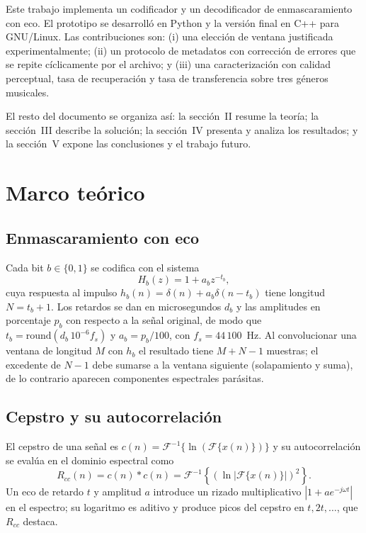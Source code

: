 \documentclass[journal]{IEEEtran}
\begin{document}
Este trabajo implementa un codificador y un decodificador de enmascaramiento con eco. El prototipo se desarrolló en Python y la versión final en C++ para GNU/Linux. Las contribuciones son: (i) una elección de ventana justificada experimentalmente; (ii) un protocolo de metadatos con corrección de errores que se repite cíclicamente por el archivo; y (iii) una caracterización con calidad perceptual, tasa de recuperación y tasa de transferencia sobre tres géneros musicales.

El resto del documento se organiza así: la sección~II resume la teoría; la sección~III describe la solución; la sección~IV presenta y analiza los resultados; y la sección~V expone las conclusiones y el trabajo futuro.

\section{Marco teórico}
\subsection{Enmascaramiento con eco}
Cada bit $b\in\{0,1\}$ se codifica con el sistema
\begin{equation}
H_b(z)=1+a_b z^{-t_b},
\label{eq:hb}
\end{equation}
cuya respuesta al impulso $h_b(n)=\delta(n)+a_b\delta(n-t_b)$ tiene longitud $N=t_b+1$. Los retardos se dan en microsegundos $d_b$ y las amplitudes en porcentaje $p_b$ con respecto a la señal original, de modo que $t_b=\mathrm{round}(d_b\,10^{-6}f_s)$ y $a_b=p_b/100$, con $f_s=44\,100$~Hz. Al convolucionar una ventana de longitud $M$ con $h_b$ el resultado tiene $M+N-1$ muestras; el excedente de $N-1$ debe sumarse a la ventana siguiente (solapamiento y suma), de lo contrario aparecen componentes espectrales parásitas.

\subsection{Cepstro y su autocorrelación}
El cepstro de una señal es $c(n)=\mathcal{F}^{-1}\{\ln(\mathcal{F}\{x(n)\})\}$ y su autocorrelación se evalúa en el dominio espectral como
\begin{equation}
R_{cc}(n)=c(n)*c(n)=\mathcal{F}^{-1}\left\{\left(\ln|\mathcal{F}\{x(n)\}|\right)^{2}\right\}.
\label{eq:rcc}
\end{equation}
Un eco de retardo $t$ y amplitud $a$ introduce un rizado multiplicativo $|1+ae^{-j\omega t}|$ en el espectro; su logaritmo es aditivo y produce picos del cepstro en $t,2t,\dots$, que $R_{cc}$ destaca.
\end{document}
